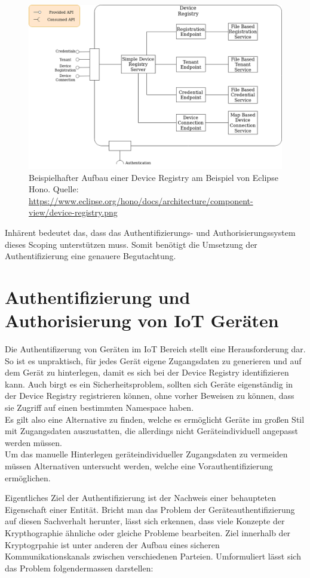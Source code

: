 \begin{figure}
    \centering
    \includegraphics[width=0.75\linewidth]{img/device-registry.png}
    \caption[Bestandteile einer Device Registry]{Beispielhafter Aufbau einer Device Registry am Beispiel von Eclipse Hono. Quelle: \url{https://www.eclipse.org/hono/docs/architecture/component-view/device-registry.png}}
    \label{fig:device_registry}
\end{figure}

Inhärent bedeutet das, dass das Authentifizierungs- und Authorisierungssystem dieses Scoping unterstützen muss. Somit benötigt die Umsetzung der Authentifizierung eine genauere Begutachtung.

\section{Authentifizierung und Authorisierung von IoT Geräten}
\label{sec:auth}

Die Authentifizerung von Geräten im IoT Bereich stellt eine Herausforderung dar. So ist es unpraktisch, für jedes Gerät eigene Zugangsdaten zu generieren und auf dem Gerät zu hinterlegen, damit es sich bei der Device Registry identifizieren kann. Auch birgt es ein Sicherheitsproblem, sollten sich Geräte eigenständig in der Device Registry registrieren können, ohne vorher Beweisen zu können, dass sie Zugriff auf einen bestimmten Namespace haben. \\
Es gilt also eine Alternative zu finden, welche es ermöglicht Geräte im großen Stil mit Zugangsdaten auszustatten, die allerdings nicht Geräteindividuell angepasst werden müssen.\\
Um das manuelle Hinterlegen geräteindividueller Zugangsdaten zu vermeiden müssen Alternativen untersucht werden, welche eine Vorauthentifizierung ermöglichen. 

Eigentliches Ziel der Authentifizierung ist der Nachweis einer behaupteten Eigenschaft einer Entität. Bricht man das Problem der Geräteauthentifizierung auf diesen Sachverhalt herunter, lässt sich erkennen, dass viele Konzepte der Krypthographie ähnliche oder gleiche Probleme bearbeiten. Ziel innerhalb der Kryptogrpahie ist unter anderen der Aufbau eines sicheren Kommunikationskanals zwischen verschiedenen Parteien. Umformuliert lässt sich das Problem folgendermassen darstellen:

